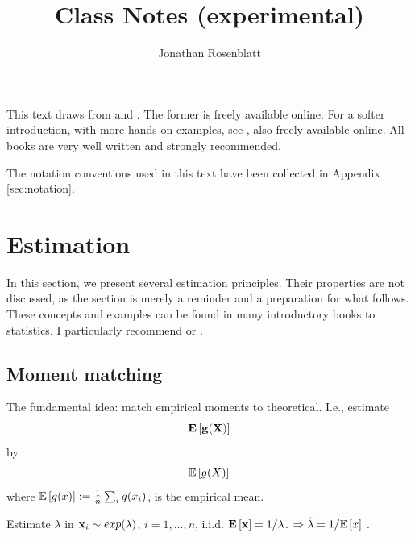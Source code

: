 






\author{Jonathan Rosenblatt}
\title{Class Notes (experimental)}






\maketitle

This text draws from \cite{hastie_elements_2003} and \cite{shalev-shwartz_understanding_2014}.
The former is freely available online.
For a softer introduction, with more hands-on examples, see \cite{james_introduction_2013}, also freely available online.
All books are very well written and strongly recommended.

The notation conventions used in this text have been collected in Appendix \ref{sec:notation}.


\tableofcontents

\newpage





\section{Estimation}
\label{sec:estimation} 
In this section, we present several estimation principles. 
Their properties are not discussed, as the section is merely a reminder and a preparation for what follows.
These concepts and examples can be found in many introductory books to statistics. I particularly recommend \cite{wasserman_all_2004} or \cite{abramovich_statistical_2013}.

\subsection{Moment matching}
\label{sec:moment_matching}

The fundamental idea: match empirical moments to theoretical. I.e., estimate
$$ \mathbf{E}\left[ \mathbf{g(X)} \right]   $$
by 
$$ \mathbb{E}\left[g(X)\right]   $$
where $\mathbb{E}\left[g(x)\right]:=\frac{1}{n}  \sum_i g(x_i)$, is the empirical mean.

\begin{example}

Estimate $\lambda$ in $\mathbf{x}_i \sim exp(\lambda)$, $i=1,\dots,n$, i.i.d.
$\mathbf{E}\left[ \mathbf{x} \right]=1/\lambda$.
$\Rightarrow \hat{\mathbf{\lambda}}=1/\mathbb{E}\left[x\right]$ .

\end{example}


